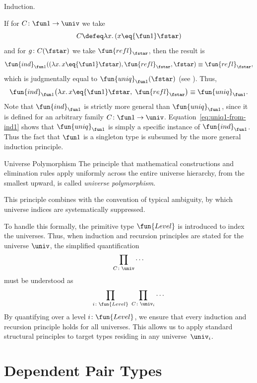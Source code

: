 \begin{lpar}{Induction.}
    \medskip
    
    If for $C\colon\fun1\to\univ$ we take
    \[
        C\defeq\lambda x.\,(x\eq{\fun1}\fstar)
    \]
    and for $g\colon C(\fstar)$ we take $\fun{refl}_\fstar$, then the result is
    \[
        \fun{ind}_{\fun1}((\lambda x.
            \,x\eq{\fun1}\fstar)
            ,\fun{refl}_\fstar
            ,\fstar)\equiv\fun{refl}_\fstar,
    \]
    which is judgmentally equal to $\fun{uniq}_{\fun1}(\fstar)$ (see ). Thus,
    \begin{equation}\label{eq:uniq1-from-ind1}
        \fun{ind}_{\fun1}\bigl(\lambda x.\,x \eq{\fun1} \fstar,\;\fun{refl}_\fstar\bigr)
        \equiv\fun{uniq}_{\fun1}.
    \end{equation}
    Note that $\fun{ind}_{\fun1}$ is strictly more general than $\fun{uniq}_{\fun1}$, since it is defined for an arbitrary family $C\colon\fun1\to\univ$. Equation~\eqref{eq:uniq1-from-ind1} shows that $\fun{uniq}_{\fun1}$ is simply a specific instance of $\fun{ind}_{\fun1}$. Thus the fact that $\fun1$ is a singleton type is subsumed by the more general induction principle.
\end{lpar}

\begin{lpar}{Universe Polymorphism}\label{lpar:universe-polymorphism}
    The principle that mathematical constructions and elimination rules apply uniformly across the entire universe hierarchy, from the smallest upward, is called \textsl{universe polymorphism}.
    
    This principle combines with the convention of typical ambiguity, by which universe indices are systematically suppressed.
    
    To handle this formally, the primitive type $\fun{Level}$ is introduced to index the universes. Thus, when induction and recursion principles are stated for the universe $\univ$, the simplified quantification
    \[
        \prod_{C\colon\univ}\cdots
    \]
    must be understood as
    \[
        \prod_{i\colon\fun{Level}}\;
        \prod_{C\colon\univ_i}
            \cdots
    \]
    By quantifying over a level $i\colon\fun{Level}$, we ensure that every induction and recursion principle holds for all universes. This allows us to apply standard structural principles to target types residing in any universe~$\univ_i$.
\end{lpar}

\section{Dependent Pair Types}

